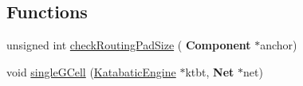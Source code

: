 \subsection*{Functions}
\begin{DoxyCompactItemize}
\item 
unsigned int \hyperlink{group__LoadGlobalRouting_gaad5d32b07d1d53ecc8642e4b10df9605}{check\+Routing\+Pad\+Size} (\textbf{ Component} $\ast$anchor)
\item 
void \hyperlink{group__LoadGlobalRouting_ga3973291866b39c10cea5ca17f7d174fb}{single\+G\+Cell} (\hyperlink{classKatabatic_1_1KatabaticEngine}{Katabatic\+Engine} $\ast$ktbt, \textbf{ Net} $\ast$net)
\end{DoxyCompactItemize}
